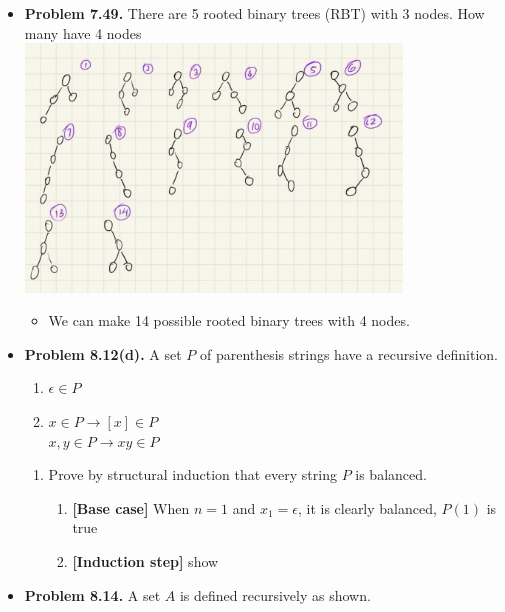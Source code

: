 \documentclass{article}
\begin{document}
\begin{itemize}
\begin{enumerate}[label=(c)]
\begin{enumerate}[label=\arabic*.]
            \end{enumerate}
        \end{enumerate}
        \item \textbf{Problem 7.49.} There are 5 rooted binary trees (RBT) with 3 nodes. How many have 4 nodes\\
        \includegraphics[width=100mm,scale=0.5]{binaryTrees.png}
        \begin{itemize}[label=$\bullet$]
            \item We can make 14 possible rooted binary trees with 4 nodes.
        \end{itemize}
        \item \textbf{Problem 8.12(d).} A set $P$ of parenthesis strings have a recursive definition.
        \begin{enumerate}[label=\arabic*.]
            \item $\epsilon \in P$
            \item $x \in P \rightarrow [x] \in P$\\
            $x,y \in P \rightarrow xy \in P$
        \end{enumerate}
        \begin{enumerate}[label=(d)]
            \item Prove by structural induction that every string $P$ is balanced.
            \begin{enumerate}[label=\roman*.]
                \item \textbf{[Base case]} When $n=1$ and $x_1 = \epsilon$, it is clearly balanced, $P(1)$ is true
                \item \textbf{[Induction step]} show
            \end{enumerate}
        \end{enumerate}
        \item \textbf{Problem 8.14.} A set $A$ is defined recursively as shown.

\end{itemize}
\end{document}
